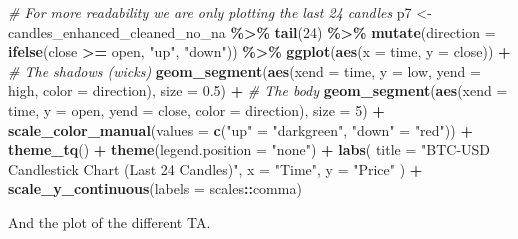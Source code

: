 \documentclass[
]{article}
\newenvironment{Shaded}{\begin{snugshade}}{\end{snugshade}}
\newcommand{\AttributeTok}[1]{\textcolor[rgb]{0.13,0.29,0.53}{#1}}
\newcommand{\CommentTok}[1]{\textcolor[rgb]{0.56,0.35,0.01}{\textit{#1}}}
\newcommand{\DecValTok}[1]{\textcolor[rgb]{0.00,0.00,0.81}{#1}}
\newcommand{\FloatTok}[1]{\textcolor[rgb]{0.00,0.00,0.81}{#1}}
\newcommand{\FunctionTok}[1]{\textcolor[rgb]{0.13,0.29,0.53}{\textbf{#1}}}
\newcommand{\NormalTok}[1]{#1}
\newcommand{\OtherTok}[1]{\textcolor[rgb]{0.56,0.35,0.01}{#1}}
\newcommand{\SpecialCharTok}[1]{\textcolor[rgb]{0.81,0.36,0.00}{\textbf{#1}}}
\newcommand{\StringTok}[1]{\textcolor[rgb]{0.31,0.60,0.02}{#1}}
\begin{document}
\begin{Shaded}
\begin{Highlighting}[]
\CommentTok{\# For more readability we are only plotting the last 24 candles}
\NormalTok{p7 }\OtherTok{\textless{}{-}}\NormalTok{ candles\_enhanced\_cleaned\_no\_na }\SpecialCharTok{\%\textgreater{}\%}
  \FunctionTok{tail}\NormalTok{(}\DecValTok{24}\NormalTok{) }\SpecialCharTok{\%\textgreater{}\%}
  \FunctionTok{mutate}\NormalTok{(}\AttributeTok{direction =} \FunctionTok{ifelse}\NormalTok{(close }\SpecialCharTok{\textgreater{}=}\NormalTok{ open, }\StringTok{"up"}\NormalTok{, }\StringTok{"down"}\NormalTok{)) }\SpecialCharTok{\%\textgreater{}\%}
  \FunctionTok{ggplot}\NormalTok{(}\FunctionTok{aes}\NormalTok{(}\AttributeTok{x =}\NormalTok{ time, }\AttributeTok{y =}\NormalTok{ close)) }\SpecialCharTok{+}
  \CommentTok{\# The shadows (wicks)}
  \FunctionTok{geom\_segment}\NormalTok{(}\FunctionTok{aes}\NormalTok{(}\AttributeTok{xend =}\NormalTok{ time, }\AttributeTok{y =}\NormalTok{ low, }\AttributeTok{yend =}\NormalTok{ high, }\AttributeTok{color =}\NormalTok{ direction), }\AttributeTok{size =} \FloatTok{0.5}\NormalTok{) }\SpecialCharTok{+}
  \CommentTok{\# The body}
  \FunctionTok{geom\_segment}\NormalTok{(}\FunctionTok{aes}\NormalTok{(}\AttributeTok{xend =}\NormalTok{ time, }\AttributeTok{y =}\NormalTok{ open, }\AttributeTok{yend =}\NormalTok{ close, }\AttributeTok{color =}\NormalTok{ direction), }\AttributeTok{size =} \DecValTok{5}\NormalTok{) }\SpecialCharTok{+}
  \FunctionTok{scale\_color\_manual}\NormalTok{(}\AttributeTok{values =} \FunctionTok{c}\NormalTok{(}\StringTok{"up"} \OtherTok{=} \StringTok{"darkgreen"}\NormalTok{, }\StringTok{"down"} \OtherTok{=} \StringTok{"red"}\NormalTok{)) }\SpecialCharTok{+}
  \FunctionTok{theme\_tq}\NormalTok{() }\SpecialCharTok{+}
  \FunctionTok{theme}\NormalTok{(}\AttributeTok{legend.position =} \StringTok{"none"}\NormalTok{) }\SpecialCharTok{+}
  \FunctionTok{labs}\NormalTok{(}
    \AttributeTok{title =} \StringTok{"BTC{-}USD Candlestick Chart (Last 24 Candles)"}\NormalTok{,}
    \AttributeTok{x =} \StringTok{"Time"}\NormalTok{,}
    \AttributeTok{y =} \StringTok{"Price"}
\NormalTok{  ) }\SpecialCharTok{+}
  \FunctionTok{scale\_y\_continuous}\NormalTok{(}\AttributeTok{labels =}\NormalTok{ scales}\SpecialCharTok{::}\NormalTok{comma)}
\end{Highlighting}
\end{Shaded}

And the plot of the different TA.
\end{document}
